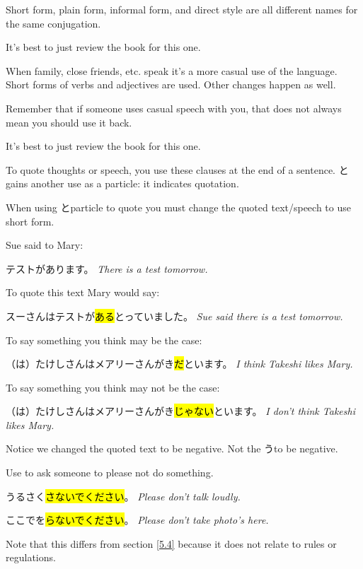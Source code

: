     {
    Short form, plain form, informal form, and direct style are all different names for the same conjugation.
    
    It's best to just review the book for this one. 
    }

    {
    When family, close friends, etc. speak it's a more casual use of the language. Short forms of verbs and adjectives are used. Other changes happen as well.
    
    Remember that if someone uses casual speech with you, that does not always mean you should use it back.
    
    It's best to just review the book for this one. 
    }

    {
    To quote thoughts or speech, you use these clauses at the end of a sentence. とgains another use as a particle: it indicates quotation.
    
    When using とparticle to quote you must change the quoted text/speech to use short form.
    
    Sue said to Mary:
    
    テストがあります。
    \textit{There is a test tomorrow.}
    
    To quote this text Mary would say:
    
    スーさんはテストが\hl{ある}とっていました。
    \textit{Sue said there is a test tomorrow.}
    
    \sectionSplit
    
    To say something you think may be the case:
    
    （は）たけしさんはメアリーさんがき\hl{だ}といます。
    \textit{I think Takeshi likes Mary.}
    
    To say something you think may not be the case:
    
    （は）たけしさんはメアリーさんがき\hl{じゃない}といます。
    \textit{I don't think Takeshi likes Mary.}
    
    Notice we changed the quoted text to be negative. Not the うto be negative.
    }

    {
    Use to ask someone to please not do something.

    \begin{center}
    \end{center}

    うるさく\hl{さないでください}。
    \textit{Please don't talk loudly.}

    ここでを\hl{らないでください}。
    \textit{Please don't take photo's here.}

    Note that this differs from section \ref{5.4} because it does not relate to rules or regulations.
    }

